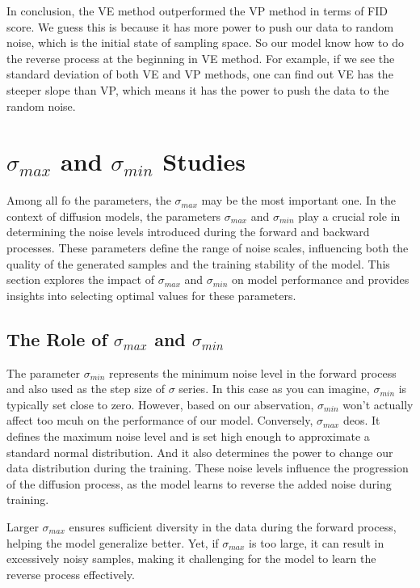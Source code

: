 In conclusion, the VE method outperformed the VP method in terms of FID score. 
We guess this is because it has more power to push our data to random noise, which is the initial state of sampling space. So our model know how to do the reverse process at the beginning in VE method. For example, if we see the standard deviation of both VE and VP methods, one can find out VE has the steeper slope than VP, which means it has the power to push the data to the random noise.

\section{$\sigma_{max}$ and $\sigma_{min}$ Studies}

Among all fo the parameters, the $\sigma_{max}$ may be the most important one. In the context of diffusion models, the parameters $\sigma_{max}$ and $\sigma_{min}$ play a crucial role in determining the noise levels introduced during the forward and backward processes. These parameters define the range of noise scales, influencing both the quality of the generated samples and the training stability of the model. This section explores the impact of $\sigma_{max}$ and $\sigma_{min}$ on model performance and provides insights into selecting optimal values for these parameters.

\subsection{The Role of $\sigma_{max}$ and $\sigma_{min}$}

The parameter $\sigma_{min}$ represents the minimum noise level in the forward process and also used as the step size of $\sigma$ series. In this case as you can imagine, $\sigma_{min}$ is typically set close to zero. However, based on our abservation, $\sigma_{min}$ won't actually affect too mcuh on the performance of our model. Conversely, $\sigma_{max}$ deos. It defines the maximum noise level and is set high enough to approximate a standard normal distribution. And it also determines the power to change our data distribution during the training. These noise levels influence the progression of the diffusion process, as the model learns to reverse the added noise during training.

Larger $\sigma_{max}$ ensures sufficient diversity in the data during the forward process, helping the model generalize better. Yet, if $\sigma_{max}$ is too large, it can result in excessively noisy samples, making it challenging for the model to learn the reverse process effectively.

